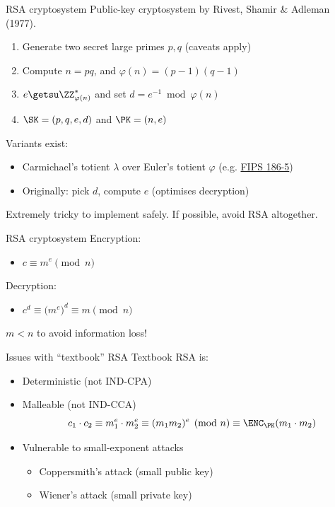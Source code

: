 \begin{frame}{RSA cryptosystem}
  Public-key cryptosystem by Rivest, Shamir \& Adleman (1977).
  
  \begin{enumerate}[<+(1)->]
    \item Generate two secret large primes $p,q$ (caveats apply)
    \item Compute $n=pq$, and $\varphi(n)=(p-1)(q-1)$
    \item $e \getsu \ZZ_{\varphi(n)}^*$ and set $d = e^{-1} \bmod \varphi(n)$
    \item $\SK=(p,q,e,d)$ and $\PK = (n,e)$
  \end{enumerate}

  \pause
  Variants exist:
  \begin{itemize}[<+(1)->]
    \item Carmichael's totient $\lambda$ over Euler's totient $\varphi$ (e.g. \href{https://csrc.nist.gov/pubs/fips/186-5/final}{FIPS 186-5})
    \item Originally: pick $d$, compute $e$ (optimises decryption)
  \end{itemize}

  \pause
  Extremely tricky to implement safely.
  If possible, avoid RSA altogether.
\end{frame}

\begin{frame}{RSA cryptosystem}
  Encryption:
  \pause
  \begin{itemize}
    \item $c \equiv m^e \pmod{n}$
  \end{itemize}

  \pause
  Decryption:
  \pause
  \begin{itemize}
    \item $c^d \equiv \bigl(m^e\bigr)^d \equiv m \pmod{n}$
  \end{itemize}

  \vspace*{1em}

  \pause
  $m < n$ to avoid information loss!
\end{frame}

\begin{frame}{Issues with \enquote{textbook} RSA}
  Textbook RSA is:
  \begin{itemize}[<+(1)->]
    \item Deterministic (not IND-CPA)
    \item Malleable (not IND-CCA)
    \[
      c_1 \cdot c_2 \equiv m_1^e \cdot m_2^e \equiv (m_1m_2)^e \pmod{n} \equiv \ENC_\PK(m_1 \cdot m_2)
    \]
    \item Vulnerable to small-exponent attacks
    \par
    \begin{itemize}
      \item Coppersmith's attack (small public key)
      \item Wiener's attack (small private key)
    \end{itemize}
  \end{itemize}
\end{frame}

